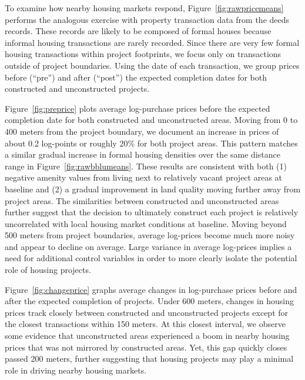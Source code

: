 \documentclass[12pt]{article}
\begin{document}
To examine how nearby housing markets respond, Figure~\ref{fig:rawpricemeans} performs the analogous exercise with property transaction data from the deeds records.  These records are likely to be composed of formal houses because informal housing transactions are rarely recorded.  Since there are very few formal housing transactions within project footprints, we focus only on transactions outside of project boundaries.  Using the date of each transaction, we group prices before (``pre'') and after (``post'') the expected completion dates for both constructed and unconstructed projects.   

Figure~\ref{fig:preprice} plots average log-purchase prices before the expected completion date for both constructed and unconstructed areas.  Moving from 0 to 400 meters from the project boundary, we document an increase in prices of about 0.2 log-points or roughly 20\% for both project areas.  This pattern matches a similar gradual increase in formal housing densities over the same distance range in Figure~\ref{fig:rawbblumeans}.  These results are consistent with both (1) negative amenity values from living next to relatively vacant project areas at baseline and (2) a gradual improvement in land quality moving further away from project areas.  The similarities between constructed and unconstructed areas further suggest that the decision to ultimately construct each project is relatively uncorrelated with local housing market conditions at baseline.  Moving beyond 500 meters from project boundaries, average log-prices become much more noisy and appear to decline on average.  Large variance in average log-prices implies a need for additional control variables in order to more clearly isolate the potential role of housing projects.

Figure~\ref{fig:changeprice} graphs average changes in log-purchase prices before and after the expected completion of projects.  Under 600 meters, changes in housing prices track closely between constructed and unconstructed projects except for the closest transactions within 150 meters.  At this closest interval, we observe some evidence that unconstructed areas experienced a boom in nearby housing prices that was not mirrored by constructed areas.  Yet, this gap quickly closes passed 200 meters, further suggesting that housing projects may play a minimal role in driving nearby housing markets.

 
\end{document}
